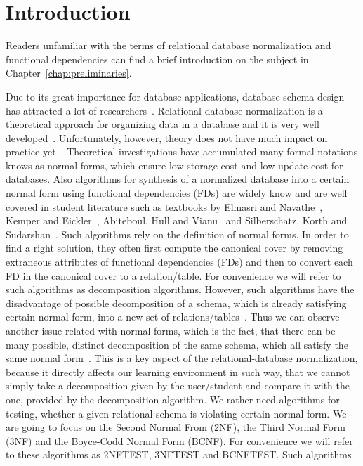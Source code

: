 \chapter{Introduction}
\label{chap:introduction}
Readers unfamiliar with the terms of relational database normalization and 
functional dependencies can find a brief introduction on the subject in
Chapter~\ref{chap:preliminaries}. 

Due to its great importance for database applications, database schema design has
attracted a lot of researchers~\cite{p1}. Relational database normalization is a 
theoretical approach for organizing data in a database and it is very well developed~\cite{p8}.
Unfortunately, however, theory does not have much impact on practice yet~\cite{p1}. 
Theoretical investigations have accumulated many formal
notations knows as normal forms, which ensure low storage cost and low update cost
for databases.
Also algorithms for synthesis of a normalized database into a certain normal form using 
functional dependencies (FDs) are widely know 
and are well covered in student literature such as textbooks by Elmasri and Navathe~\cite{bdb1}, 
Kemper and Eickler~\cite{bdb2}, Abiteboul, Hull and Vianu~\cite{bdb3}
and Silberschatz, Korth and Sudarshan~\cite{bdb4}.
Such algorithms rely on the definition of normal forms. In order to find a right 
solution, they often first compute the canonical cover by removing extraneous 
attributes of functional dependencies (FDs) and then to convert each FD in the 
canonical cover to a relation/table. For convenience we will refer to such algorithms as
decomposition algorithms. However, such algorithms have the 
disadvantage of possible decomposition of a schema, which is already satisfying 
certain normal form, into a new set of relations/tables~\cite{p4}. Thus we can observe 
another issue related with normal forms, which is the fact, that there can be many 
possible, distinct decomposition of the same schema, which all satisfy the same 
normal form~\cite{bdb4}. 
This is a key aspect of the relational-database normalization, because it directly 
affects our learning environment in such way, that we cannot simply take a decomposition given 
by the user/student and compare it with the one, provided by the decomposition algorithm. 
We rather need algorithms for testing, whether a given relational schema is violating 
certain normal form. We are going to focus on the Second Normal From (2NF), 
the Third Normal Form (3NF) and the Boyce-Codd Normal Form (BCNF). For convenience we 
will refer to these algorithms as 2NFTEST, 3NFTEST and BCNFTEST. Such algorithms 

